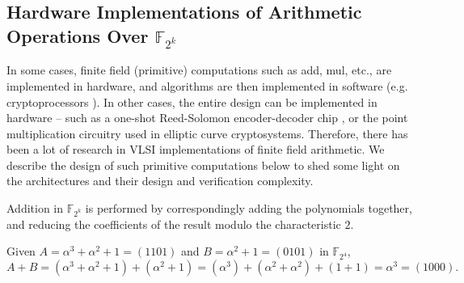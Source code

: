 \subsection{Hardware Implementations of Arithmetic Operations Over $\mathbb{F}_{2^k}$}

In some cases, finite field (primitive) computations such as {\sc add, mul,} etc., are implemented in hardware, and  
algorithms are then implemented in software (e.g. cryptoprocessors \cite{ST23} \cite{kobayashi}). 
In other cases, the entire design can be implemented in hardware -- such as a one-shot Reed-Solomon
encoder-decoder chip \cite{reed-solo-chip} \cite{ecc163}, or the point multiplication circuitry \cite{ecc:software} used in elliptic curve cryptosystems.  
Therefore, there has been a lot of research in VLSI implementations of finite field arithmetic.
We describe the design of such primitive computations below to shed some light on the architectures and their design and verification complexity.


Addition in $\mathbb{F}_{2^k}$ is performed by correspondingly adding the
 polynomials together, and reducing the coefficients of the result modulo the characteristic $2$.

\begin{Example}
Given $A=\alpha^3+\alpha^2+1=(1101) $ and $B=\alpha^2+1=(0101)$ in $\mathbb{F}_{2^4}$, 
\begin{equation}
A+B=(\alpha^3+\alpha^2+1)+(\alpha^2+1)=(\alpha^3) + (\alpha^2+\alpha^2) +(1+1)=\alpha^3=(1000). \nonumber
 \end{equation}
\end{Example}

